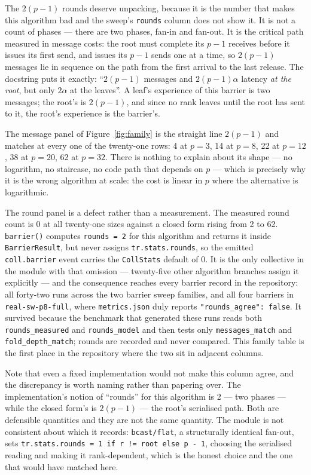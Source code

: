 \documentclass[11pt]{article}
\begin{document}
The $2(p-1)$ rounds deserve unpacking, because it is the number that makes this algorithm bad
and the sweep's \texttt{rounds} column does not show it. It is not a count of phases --- there
are two phases, fan-in and fan-out. It is the critical path measured in message costs: the root
must complete its $p-1$ receives before it issues its first send, and issues its $p-1$ sends one
at a time, so $2(p-1)$ messages lie in sequence on the path from the first arrival to the last
release. The docstring puts it exactly: ``$2(p-1)$ messages and $2(p-1)\alpha$ latency
\emph{at the root}, but only $2\alpha$ at the leaves''. A leaf's experience of this barrier is
two messages; the root's is $2(p-1)$, and since no rank leaves until the root has sent to it,
the root's experience is the barrier's.

The message panel of Figure~\ref{fig:family} is the straight line $2(p-1)$ and matches at every
one of the twenty-one rows: 4 at $p=3$, 14 at $p=8$, 22 at $p=12$, 38 at $p=20$, 62 at $p=32$.
There is nothing to explain about its shape --- no logarithm, no staircase, no code path that
depends on $p$ --- which is precisely why it is the wrong algorithm at scale: the cost is linear
in $p$ where the alternative is logarithmic.

The round panel is a defect rather than a measurement. The measured round count is 0 at all
twenty-one sizes against a closed form rising from 2 to 62. \texttt{barrier()} computes
\texttt{rounds = 2} for this algorithm and returns it inside \texttt{BarrierResult}, but never
assigns \texttt{tr.stats.rounds}, so the emitted \texttt{coll.barrier} event carries the
\texttt{CollStats} default of 0. It is the only collective in the module with that omission ---
twenty-five other algorithm branches assign it explicitly --- and the consequence reaches every
barrier record in the repository: all forty-two runs across the two barrier sweep families, and
all four barriers in \texttt{real-sw-p8-full}, where \texttt{metrics.json} duly reports
\texttt{"rounds\_agree": false}. It survived because the benchmark that generated these runs
reads both \texttt{rounds\_measured} and \texttt{rounds\_model} and then tests only
\texttt{messages\_match} and \texttt{fold\_depth\_match}; rounds are recorded and never
compared. This family table is the first place in the repository where the two sit in adjacent
columns.

Note that even a fixed implementation would not make this column agree, and the discrepancy is
worth naming rather than papering over. The implementation's notion of ``rounds'' for this
algorithm is 2 --- two phases --- while the closed form's is $2(p-1)$ --- the root's serialised
path. Both are defensible quantities and they are not the same quantity. The module is not
consistent about which it records: \texttt{bcast/flat}, a structurally identical fan-out, sets
\texttt{tr.stats.rounds = 1 if r != root else p - 1}, choosing the serialised reading and making
it rank-dependent, which is the honest choice and the one that would have matched here.
\end{document}
